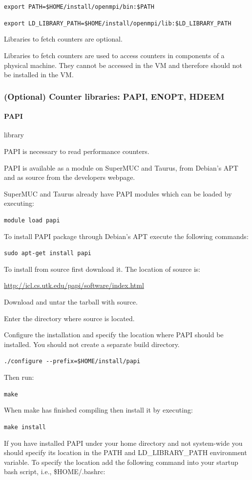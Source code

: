 \documentclass[11pt,a4paper, oneside]{book} %
\newcommand{\papiurl}{\url{http://icl.cs.utk.edu/papi/software/index.html} }
\newcommand{\installloc}[1]{\$HOME/install/#1}
\begin{document}
\texttt{export PATH=\installloc{openmpi/bin}:\$PATH}

\texttt{export LD\_LIBRARY\_PATH=\installloc{openmpi/lib}:\$LD\_LIBRARY\_PATH}

Libraries to fetch counters are optional.

Libraries to fetch counters are used to access counters in components of a
physical machine. They cannot be accessed in the VM and therefore should not be
installed in the VM.


\subsubsection{(Optional) Counter libraries: PAPI, ENOPT, HDEEM}
\paragraph{PAPI} library

PAPI is necessary to read performance counters.

PAPI is available as a module on SuperMUC and Taurus, from Debian's APT and as
source from the developers webpage.

SuperMUC and Taurus already have PAPI modules which can be loaded by executing:

\texttt{module load papi}

To install PAPI package through Debian's APT execute the following commands:

\texttt{sudo apt-get install papi}

To install from source first download it.
The location of source is:

\papiurl

Download and untar the tarball with source.

Enter the directory where source is located.

Configure the installation and specify the location where PAPI should
be installed. You should not create a separate build directory.

\texttt{./configure -{}-prefix=\installloc{papi}}

Then run:

\texttt{make}

When make has finished compiling then install it by executing:

\texttt{make install}

If you have installed PAPI under your home directory and not system-wide you
should specify its location in the PATH and LD\_LIBRARY\_PATH environment
variable. To specify the location add the following command into your startup
bash script, i.e., \$HOME/.bashrc:
\end{document}

